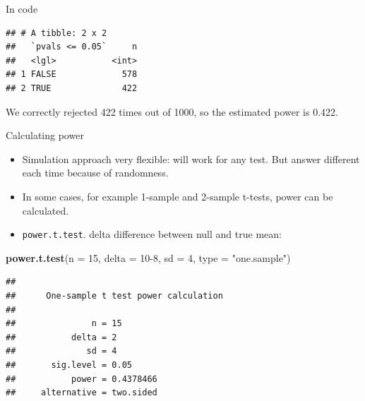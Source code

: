 \documentclass[
  ignorenonframetext,
]{beamer}
\newenvironment{Shaded}{\begin{snugshade}}{\end{snugshade}}
\newcommand{\DataTypeTok}[1]{\textcolor[rgb]{0.13,0.29,0.53}{#1}}
\newcommand{\DecValTok}[1]{\textcolor[rgb]{0.00,0.00,0.81}{#1}}
\newcommand{\FloatTok}[1]{\textcolor[rgb]{0.00,0.00,0.81}{#1}}
\newcommand{\KeywordTok}[1]{\textcolor[rgb]{0.13,0.29,0.53}{\textbf{#1}}}
\newcommand{\NormalTok}[1]{#1}
\newcommand{\OperatorTok}[1]{\textcolor[rgb]{0.81,0.36,0.00}{\textbf{#1}}}
\newcommand{\StringTok}[1]{\textcolor[rgb]{0.31,0.60,0.02}{#1}}
\providecommand{\tightlist}{%
  \setlength{\itemsep}{0pt}\setlength{\parskip}{0pt}}
\begin{document}
\begin{frame}[fragile]{In code}
\protect\hypertarget{in-code}{}

\begin{Shaded}
\end{Shaded}

\begin{verbatim}
## # A tibble: 2 x 2
##   `pvals <= 0.05`     n
##   <lgl>           <int>
## 1 FALSE             578
## 2 TRUE              422
\end{verbatim}

We correctly rejected 422 times out of 1000, so the estimated power is
0.422.

\end{frame}

\begin{frame}[fragile]{Calculating power}
\protect\hypertarget{calculating-power}{}

\begin{itemize}
\tightlist
\item
  Simulation approach very flexible: will work for any test. But answer
  different each time because of randomness.
\item
  In some cases, for example 1-sample and 2-sample t-tests, power can be
  calculated.
\item
  \texttt{power.t.test}. delta difference between null and true mean:
\end{itemize}

\small

\begin{Shaded}
\begin{Highlighting}[]
\KeywordTok{power.t.test}\NormalTok{(}\DataTypeTok{n =} \DecValTok{15}\NormalTok{, }\DataTypeTok{delta =} \DecValTok{10-8}\NormalTok{, }\DataTypeTok{sd =} \DecValTok{4}\NormalTok{, }\DataTypeTok{type =} \StringTok{"one.sample"}\NormalTok{)}
\end{Highlighting}
\end{Shaded}

\begin{verbatim}
## 
##      One-sample t test power calculation 
## 
##               n = 15
##           delta = 2
##              sd = 4
##       sig.level = 0.05
##           power = 0.4378466
##     alternative = two.sided
\end{verbatim}

\normalsize

\end{frame}
\end{document}
